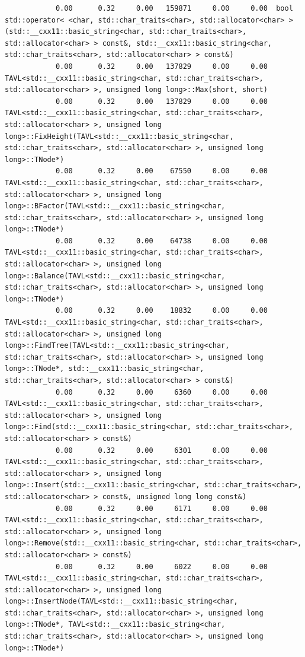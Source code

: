\documentclass[12pt]{article}
\begin{document}
\begin{small}
\begin{verbatim}
			0.00      0.32     0.00   159871     0.00     0.00  bool std::operator< <char, std::char_traits<char>, std::allocator<char> >(std::__cxx11::basic_string<char, std::char_traits<char>, std::allocator<char> > const&, std::__cxx11::basic_string<char, std::char_traits<char>, std::allocator<char> > const&)
			0.00      0.32     0.00   137829     0.00     0.00  TAVL<std::__cxx11::basic_string<char, std::char_traits<char>, std::allocator<char> >, unsigned long long>::Max(short, short)
			0.00      0.32     0.00   137829     0.00     0.00  TAVL<std::__cxx11::basic_string<char, std::char_traits<char>, std::allocator<char> >, unsigned long long>::FixHeight(TAVL<std::__cxx11::basic_string<char, std::char_traits<char>, std::allocator<char> >, unsigned long long>::TNode*)
			0.00      0.32     0.00    67550     0.00     0.00  TAVL<std::__cxx11::basic_string<char, std::char_traits<char>, std::allocator<char> >, unsigned long long>::BFactor(TAVL<std::__cxx11::basic_string<char, std::char_traits<char>, std::allocator<char> >, unsigned long long>::TNode*)
			0.00      0.32     0.00    64738     0.00     0.00  TAVL<std::__cxx11::basic_string<char, std::char_traits<char>, std::allocator<char> >, unsigned long long>::Balance(TAVL<std::__cxx11::basic_string<char, std::char_traits<char>, std::allocator<char> >, unsigned long long>::TNode*)
			0.00      0.32     0.00    18832     0.00     0.00  TAVL<std::__cxx11::basic_string<char, std::char_traits<char>, std::allocator<char> >, unsigned long long>::FindTree(TAVL<std::__cxx11::basic_string<char, std::char_traits<char>, std::allocator<char> >, unsigned long long>::TNode*, std::__cxx11::basic_string<char, std::char_traits<char>, std::allocator<char> > const&)
			0.00      0.32     0.00     6360     0.00     0.00  TAVL<std::__cxx11::basic_string<char, std::char_traits<char>, std::allocator<char> >, unsigned long long>::Find(std::__cxx11::basic_string<char, std::char_traits<char>, std::allocator<char> > const&)
			0.00      0.32     0.00     6301     0.00     0.00  TAVL<std::__cxx11::basic_string<char, std::char_traits<char>, std::allocator<char> >, unsigned long long>::Insert(std::__cxx11::basic_string<char, std::char_traits<char>, std::allocator<char> > const&, unsigned long long const&)
			0.00      0.32     0.00     6171     0.00     0.00  TAVL<std::__cxx11::basic_string<char, std::char_traits<char>, std::allocator<char> >, unsigned long long>::Remove(std::__cxx11::basic_string<char, std::char_traits<char>, std::allocator<char> > const&)
			0.00      0.32     0.00     6022     0.00     0.00  TAVL<std::__cxx11::basic_string<char, std::char_traits<char>, std::allocator<char> >, unsigned long long>::InsertNode(TAVL<std::__cxx11::basic_string<char, std::char_traits<char>, std::allocator<char> >, unsigned long long>::TNode*, TAVL<std::__cxx11::basic_string<char, std::char_traits<char>, std::allocator<char> >, unsigned long long>::TNode*)

\end{verbatim}
\end{small}
\end{document}
